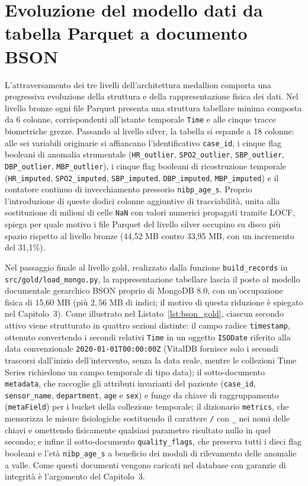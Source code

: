 \section{Evoluzione del modello dati da tabella Parquet a documento BSON}
L'attraversamento dei tre livelli dell'architettura medallion comporta una progressiva evoluzione della struttura e della rappresentazione fisica dei dati. Nel livello bronze ogni file Parquet presenta una struttura tabellare minima composta da 6 colonne, corrispondenti all'istante temporale \texttt{Time} e alle cinque tracce biometriche grezze. Passando al livello silver, la tabella si espande a 18 colonne: alle sei variabili originarie si affiancano l'identificativo \texttt{case\_id}, i cinque flag booleani di anomalia strumentale (\texttt{HR\_outlier}, \texttt{SPO2\_outlier}, \texttt{SBP\_outlier}, \texttt{DBP\_outlier}, \texttt{MBP\_outlier}), i cinque flag booleani di ricostruzione temporale (\texttt{HR\_imputed}, \texttt{SPO2\_imputed}, \texttt{SBP\_imputed}, \texttt{DBP\_imputed}, \texttt{MBP\_imputed}) e il contatore continuo di invecchiamento pressorio \texttt{nibp\_age\_s}. Proprio l'introduzione di queste dodici colonne aggiuntive di tracciabilit\`a, unita alla sostituzione di milioni di celle \texttt{NaN} con valori numerici propagati tramite LOCF, spiega per quale motivo i file Parquet del livello silver occupino su disco pi\`u spazio rispetto al livello bronze (44,52 MB contro 33,95 MB, con un incremento del 31,1\%).

Nel passaggio finale al livello gold, realizzato dalla funzione \texttt{build\_\allowbreak records} in \texttt{src/gold/\allowbreak load\_\allowbreak mongo.py}, la rappresentazione tabellare lascia il posto al modello documentale gerarchico BSON proprio di MongoDB 8.0, con un'occupazione fisica di 15,60 MB (pi\`u $2,56\text{ MB}$ di indici; il motivo di questa riduzione \`e spiegato nel Capitolo~3). Come illustrato nel Listato~\ref{lst:bson_gold}, ciascun secondo attivo viene strutturato in quattro sezioni distinte: il campo radice \texttt{timestamp}, ottenuto convertendo i secondi relativi \texttt{Time} in un oggetto \texttt{ISODate} riferito alla data convenzionale \texttt{2020-01-01T00:00:00Z} (VitalDB fornisce solo i secondi trascorsi dall'inizio dell'intervento, senza la data reale, mentre le collezioni Time Series richiedono un campo temporale di tipo data); il sotto-documento \texttt{metadata}, che raccoglie gli attributi invarianti del paziente (\texttt{case\_id}, \texttt{sensor\_name}, \texttt{department}, \texttt{age} e \texttt{sex}) e funge da chiave di raggruppamento (\texttt{metaField}) per i bucket della collezione temporale; il dizionario \texttt{metrics}, che memorizza le misure fisiologiche sostituendo il carattere \texttt{/} con \texttt{\_} nei nomi delle chiavi e omettendo fisicamente qualsiasi parametro risultato nullo in quel secondo; e infine il sotto-documento \texttt{quality\_flags}, che preserva tutti i dieci flag booleani e l'et\`a \texttt{nibp\_age\_s} a beneficio dei moduli di rilevamento delle anomalie a valle. Come questi documenti vengono caricati nel database con garanzie di integrit\`a \`e l'argomento del Capitolo~3.

